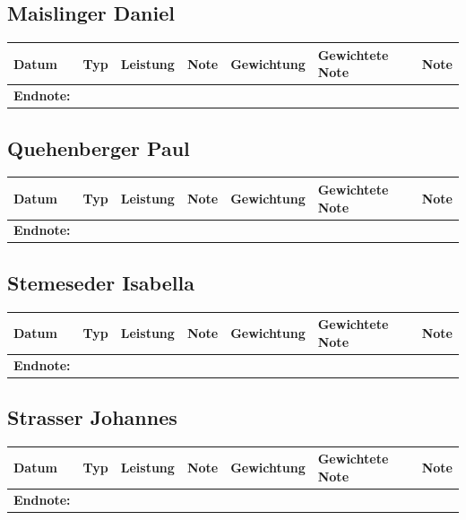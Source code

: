 \documentclass[11pt]{article}
\begin{document}
\subsection{Maislinger Daniel}
\label{sec:org8ef1d2a}
\begin{center}
\begin{tabular}{lllllll}
Datum & Typ & Leistung & Note & Gewichtung & Gewichtete Note & Note\\
\hline
\hline
\textbf{Endnote:} &  &  &  &  &  & \\
\end{tabular}
\end{center}
\subsection{Quehenberger Paul}
\label{sec:orge2d501a}
\begin{center}
\begin{tabular}{lllllll}
Datum & Typ & Leistung & Note & Gewichtung & Gewichtete Note & Note\\
\hline
\hline
\textbf{Endnote:} &  &  &  &  &  & \\
\end{tabular}
\end{center}
\subsection{Stemeseder Isabella}
\label{sec:orgaaa44a8}
\begin{center}
\begin{tabular}{lllllll}
Datum & Typ & Leistung & Note & Gewichtung & Gewichtete Note & Note\\
\hline
\hline
\textbf{Endnote:} &  &  &  &  &  & \\
\end{tabular}
\end{center}
\subsection{Strasser Johannes}
\label{sec:org7453ecf}
\begin{center}
\begin{tabular}{lllllll}
Datum & Typ & Leistung & Note & Gewichtung & Gewichtete Note & Note\\
\hline
\hline
\textbf{Endnote:} &  &  &  &  &  & \\
\end{tabular}
\end{center}
\end{document}
